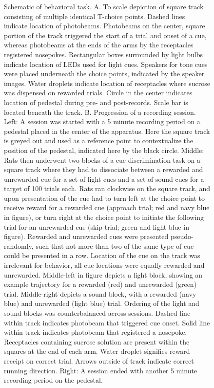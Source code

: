 \documentclass[11pt]{article}
\begin{document}
\begin{figure}[h]
\caption{Schematic of behavioral task. A. To scale depiction of square track consisting of multiple identical T-choice points. Dashed lines indicate location of photobeams. Photobeams on the center, square portion of the track triggered the start of a trial and onset of a cue, whereas photobeams at the ends of the arms by the receptacles registered nosepokes. Rectangular boxes surrounded by light bulbs indicate location of LEDs used for light cues. Speakers for tone cues were placed underneath the choice points, indicated by the speaker images. Water droplets indicate location of receptacles where sucrose was dispensed on rewarded trials. Circle in the center indicates location of pedestal during pre- and post-records. Scale bar is located beneath the track. B. Progression of a recording session. Left: A session was started with a 5 minute recording period on a pedestal placed in the center of the apparatus. Here the square track is greyed out and used as a reference point to contextualize the position of the pedestal, indicated here by the black circle. Middle: Rats then underwent two blocks of a cue discrimination task on a square track where they had to dissociate between a rewarded and unrewarded cue for a set of light cues and a set of sound cues for a target of 100 trials each. Rats ran clockwise on the square track, and upon presentation of the cue had to turn left at the choice point to receive reward for a rewarded cue (approach trial; red and navy blue in figure), or turn right at the choice point to initiate the following trial for an unrewarded cue (skip trial; green and light blue in figure). Rewarded and unrewarded cues were presented pseudo-randomly, such that not more than two of the same type of cue could be presented in a row. Location of the cue on the track was irrelevant for behavior, all cue locations were equally rewarded and unrewarded. Middle-left in figure depicts a light block, showing an example trajectory for a rewarded (red) and unrewarded (green) trial. Middle-right depicts a sound block, with a rewarded (navy blue) and unrewarded (light blue) trial. Ordering of the light and sound blocks was counterbalanced across sessions. Dashed line within track indicates photobeam that triggered cue onset. Solid line within track indicates photobeam that registered a nosepoke. Receptacles containing sucrose solution are present within the squares at the end of each arm. Water droplet signifies reward receipt on correct trial. Arrows outside of track indicate correct running direction. Right: A session ended with another 5 minute recording period on the pedestal.}
\label{fig:task}
\end{figure}
\end{document}

